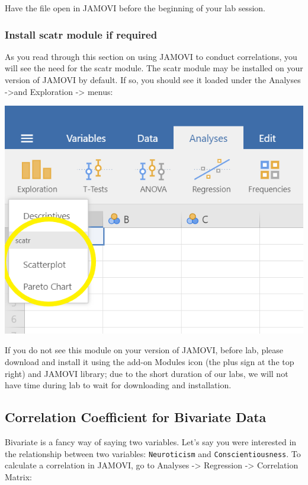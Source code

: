 \documentclass[
]{book}
\begin{document}
Have the file open in JAMOVI before the beginning of your lab session.

\hypertarget{install-scatr-module-if-required}{%
\subsubsection{Install scatr module if required}\label{install-scatr-module-if-required}}

As you read through this section on using JAMOVI to conduct correlations, you will see the need for the scatr module. The scatr module may be installed on your version of JAMOVI by default. If so, you should see it loaded under the {Analyses} -\textgreater and {Exploration} -\textgreater{} menus:

\includegraphics{img/CheckingForSCATRModule_Highlighting.png}

If you do not see this module on your version of JAMOVI, before lab, please download and install it using the add-on Modules icon (the plus sign at the top right) and JAMOVI library; due to the short duration of our labs, we will not have time during lab to wait for downloading and installation.

\hypertarget{correlation-coefficient-for-bivariate-data-1}{%
\subsection{Correlation Coefficient for Bivariate Data}\label{correlation-coefficient-for-bivariate-data-1}}

Bivariate is a fancy way of saying two variables. Let's say you were interested in the relationship between two variables: \texttt{Neuroticism} and \texttt{Conscientiousness}. To calculate a correlation in JAMOVI, go to {Analyses} -\textgreater{} {Regression} -\textgreater{} {Correlation Matrix}:
\end{document}
